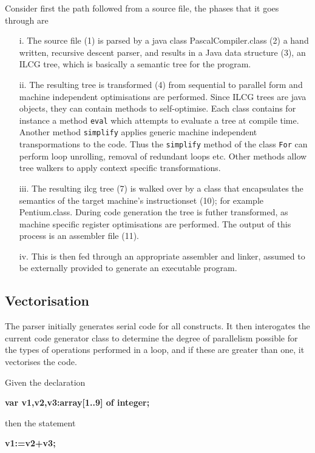 Consider first the path followed from a source file, the phases that it goes through are
\begin{itemize}
\item[i.] The source file (1) is parsed by a java class PascalCompiler.class (2) a   
hand written, recursive descent parser\cite{Watt}, and results
in a Java data structure (3), an ILCG tree, which is basically a semantic
tree for the program. %
\item[ii.] The resulting tree is transformed (4) from sequential to parallel form
and  machine independent optimisations are performed.
Since ILCG trees
 are java objects, they can contain methods to self-optimise. Each class
contains for instance a method {\tt eval} which attempts to evaluate a tree at
compile time. Another method {\tt simplify} applies generic machine
independent transpormations to the code. Thus the {\tt simplify}
method of the class {\tt For} can perform loop unrolling,
removal of redundant loops etc. Other methods allow tree walkers
to apply context specific transformations.
\item[iii.] The resulting ilcg tree (7) is walked over by a class that encapsulates
the semantics of the target machine's instructionset (10); for example Pentium.class.
During code generation the tree is futher transformed, as machine
specific register optimisations are performed. 
The output of this process is an assembler file (11).
\item[iv.] This is then fed through an appropriate assembler and linker, assumed
to be externally provided to generate an executable program.
\end{itemize}

\subsection{Vectorisation}

The parser initially generates serial code for all constructs.
It then interogates the current code generator class to determine
the degree of parallelism possible for the types of operations performed
in a loop, and if these are greater than one, it vectorises the code.

Given the declaration 

{\bf var v1,v2,v3:array[1..9] of integer;}

then the statement

{\bf v1:=v2+v3;}


